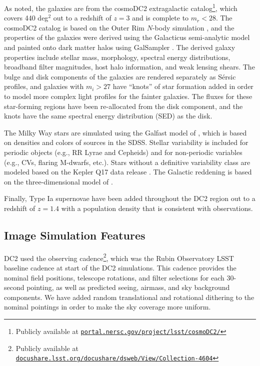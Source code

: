 \documentclass[modern]{descnote}
\newcommand*{\https}[1]{\href{https://#1}{\nolinkurl{#1}}}
\begin{document}
As noted, the galaxies are from the cosmoDC2 extragalactic catalog\footnote{Publicly available at \https{portal.nersc.gov/project/lsst/cosmoDC2/}}, which covers 440 deg$^2$ out to a redshift of $z = 3$ and is complete to $m_r <28$.  The cosmoDC2 catalog is based on the Outer Rim $N$-body simulation \citep{2019ApJS..245...16H}, and the properties of the galaxies were derived using the Galacticus semi-analytic model \citep{benson_2010b} and painted onto dark matter halos using GalSampler \citep{2020MNRAS.495.5040H}.  The derived galaxy properties include stellar mass, morphology, spectral energy distributions, broadband filter magnitudes, host halo information, and weak lensing shears.   The bulge and disk components of the galaxies are rendered separately as S\'ersic profiles, and galaxies with $m_i > 27$ have ``knots'' of star formation added in order to model more complex light profiles for the fainter galaxies. The fluxes for these star-forming regions have been re-allocated from the disk component, and the knots have the same spectral energy distribution (SED) as the disk.

The Milky Way stars are simulated using the Galfast model of \citet{2008ApJ...673..864J}, which is based on densities and colors of sources in the SDSS. Stellar variability is included for periodic objects (e.g., RR Lyrae and Cepheids) and for non-periodic variables (e.g., CVs, flaring M-dwarfs, etc.).  Stars without a definitive variability class are modeled based on the Kepler Q17 data release \citep{2016ksci.rept....3T}.  The Galactic reddening is based on the three-dimensional model of \cite{2005AJ....130..659A}.

Finally, Type Ia supernovae have been added throughout the DC2 region out to a redshift of $z=1.4$ with a population density that is consistent with observations.

\subsection{Image Simulation Features}

DC2 used the  observing cadence\footnote{Publicly available at \https{docushare.lsst.org/docushare/dsweb/View/Collection-4604}}, which was the Rubin Observatory LSST baseline cadence at start of the DC2 simulations. This cadence provides the nominal field positions, telescope rotations, and filter selections for each 30-second pointing, as well as predicted seeing, airmass, and sky background components.  We have added random translational and rotational dithering to the nominal pointings in order to make the sky coverage more uniform.
\end{document}
